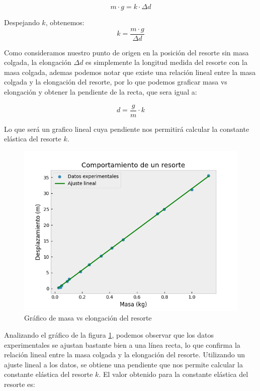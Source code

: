 \documentclass{article}
\begin{document}
\begin{multicols}{2}
        \begin{equation}
            m \cdot g = k \cdot \Delta d
        \end{equation}

        Despejando $k$, obtenemos:
        \begin{equation}
            k = \frac{m \cdot g}{\Delta d}
        \end{equation}

        Como consideramos nuestro punto de origen en la posición del resorte sin masa colgada,
        la elongación $\Delta d$ es simplemente la longitud medida del resorte con la masa colgada, ademas
        podemos notar que existe una relación lineal entre la masa colgada y la elongación del resorte,
        por lo que podemos graficar masa vs elongación y obtener la pendiente de la recta, que sera igual
        a:

        \begin{equation}
            d = \dfrac{g}{m} \cdot k
        \end{equation}

        Lo que será un grafico lineal cuya pendiente nos permitirá calcular la constante elástica del resorte 
        $k$.

        \begin{figure}[H]
            \includegraphics[width=\linewidth]{Cons_elast.png}
        \caption{Gráfico de masa vs elongación del resorte}
        \label{fig:resorte}
        \end{figure}

        Analizando el gráfico de la figura \ref{fig:resorte}, podemos observar que los datos experimentales
        se ajustan bastante bien a una línea recta, lo que confirma la relación lineal entre la masa colgada y la elongación del resorte.
        Utilizando un ajuste lineal a los datos, se obtiene una pendiente que nos permite calcular la constante elástica del resorte $k$.
        El valor obtenido para la constante elástica del resorte es:


\end{multicols}
\end{document}
